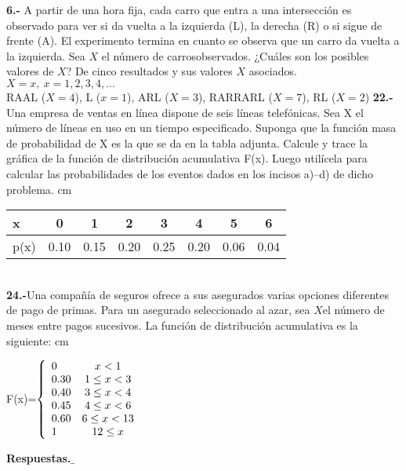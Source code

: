\documentclass[12pt, letterpaper, spanish]{article}
\newcommand{\jump}{\vskip 0.01cm}
\begin{document}
\textbf{6.-} A partir de una hora fija, cada carro que entra a una intersección es observado para ver si da vuelta a la izquierda (L), la derecha (R) o si sigue de frente (A). El experimento termina en cuanto se observa que un carro da vuelta a la izquierda. Sea $X$ el número de carrosobservados. ¿Cuáles son los posibles valores de $X$? De cinco resultados y sus valores $X$ asociados.\\
$X = x,\ x=1,2,3,4,...$\\
RAAL ($X=4$), L ($x=1$), ARL ($X=3$), RARRARL ($X=7$), RL ($X=2$) \vskip0.5cm
\textbf{22.-}Una empresa de ventas en línea dispone de seis líneas telefónicas. Sea X el número de líneas en uso en un tiempo especificado. Suponga que la función masa de probabilidad de X es la que se da en la tabla adjunta. Calcule y trace la gráfica de la función de distribución acumulativa F(x). Luego utilícela para calcular las probabilidades de los eventos dados en los incisos a)–d) de dicho problema.  cm
\begin{tabular}{l|c c c c c c c}
    x&0&1&2&3&4&5&6\\
    \hline
    p(x)&0.10&0.15&0.20&0.25&0.20&0.06&0.04\\
\end{tabular}\\
\textbf{24.-}Una compañía de seguros ofrece a sus asegurados varias opciones diferentes de pago de primas. Para un asegurado seleccionado al azar, sea $X$el número de meses entre pagos sucesivos. La función de distribución acumulativa es la siguiente: cm
\begin{center}
F(x)=$\left\{\begin{array}{l c}
    0 & x<1\\
    0.30 & 1 \leq x < 3\\
    0.40 & 3 \leq x < 4\\
    0.45 & 4 \leq x < 6\\
    0.60 & 6 \leq x < 13\\
    1    & 12 \leq x\\
\end{array}\right.$
\end{center} \jump
\textbf{Respuestas.$\_$}\jump
\end{document}
